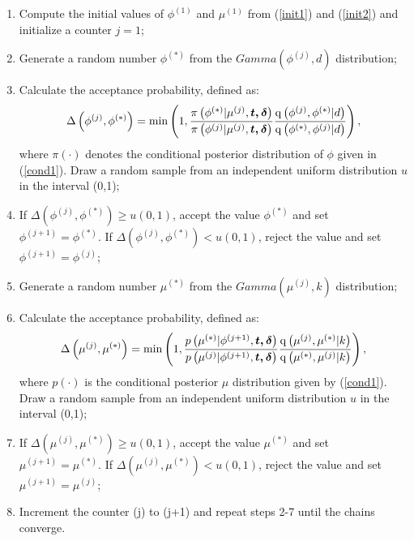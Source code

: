 \begin{enumerate}
\item Compute the initial values of $\phi^{(1)}$ and $\mu^{(1)}$ from (\ref{init1}) and (\ref{init2}) and initialize a counter $j=1$;
\item Generate a random number $\phi^{(*)}$ from the $Gamma(\phi^{(j)}, d)$ distribution;
\item Calculate the acceptance probability, defined as:
\begin{equation*}
\Delta\left(\phi^{(j)},\phi^{(*)}\right)=\min\left(1, \frac{\pi\left(\phi^{(*)}|\mu^{(j)},\boldsymbol{t,\delta}\right)}{\pi\left(\phi^{(j)}|\mu^{(j)},\boldsymbol{t,\delta}\right)} \frac{\operatorname{q}\left(\phi^{(j)},\phi^{(*)}|d\right)}{\operatorname{q}\left(\phi^{(*)},\phi^{(j)}|d\right)}\right),
\end{equation*}
where $\pi(\cdot)$ denotes the conditional posterior distribution of $\phi$ given in (\ref{cond1}). Draw a random sample from an independent uniform distribution $u$ in the interval (0,1);
\item If $\Delta\left(\phi^{(j)},\phi^{(*)}\right)\geq u(0,1)$, accept the value $\phi^{(*)}$ and set $\phi^{(j+1)}=\phi^{(*)}$. If $\Delta\left(\phi^{(j)},\phi^{(*)}\right)< u(0,1)$, reject the value and set $\phi^{(j+1)}=\phi^{(j)}$;

\item Generate a random number $\mu^{(*)}$ from the $Gamma(\mu^{(j)}, k)$ distribution;
\item Calculate the acceptance probability, defined as:
\begin{equation*}
\Delta\left(\mu^{(j)},\mu^{(*)}\right)=\min\left(1, \frac{p\left(\mu^{(*)}|\phi^{(j+1)},\boldsymbol{t,\delta}\right)}{p\left(\mu^{(j)}|\phi^{(j+1)},\boldsymbol{t,\delta}\right)} \frac{\operatorname{q}\left(\mu^{(j)},\mu^{(*)}|k\right)}{\operatorname{q}\left(\mu^{(*)},\mu^{(j)}|k\right)}\right),
\end{equation*}
where $p(\cdot)$ is the conditional posterior $\mu$ distribution given by (\ref{cond1}). Draw a random sample from an independent uniform distribution $u$ in the interval (0,1);
\item If $\Delta\left(\mu^{(j)},\mu^{(*)}\right)\geq u(0,1)$, accept the value $\mu^{(*)}$ and set $\mu^{(j+1)}=\mu^{(*)}$. If $\Delta\left(\mu^{(j)},\mu^{(*)}\right)< u(0,1)$, reject the value and set $\mu^{(j+1)}=\mu^{(j)}$;

\item Increment the counter (j) to (j+1) and repeat steps 2-7 until the chains converge.
\end{enumerate}


